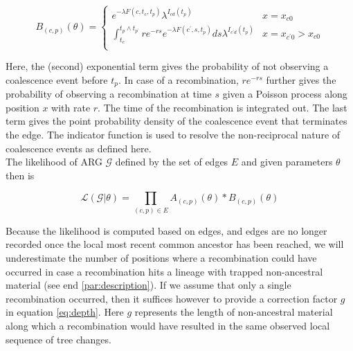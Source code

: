 \documentclass{article}
\begin{document}
\begin{equation}\label{eq:depth}
B_{(c, p)}(\theta) = \begin{cases}
e^{-\lambda F(c, t_c, t_p)} \lambda^{I_{cd}(t_p)} & x=x_{c0} \\
\int_{t_c}^{t_{p} \wedge t_{p^{\prime}}} r e^{-rs} e^{-\lambda F(c^{\prime}, s, t_{p})} ds \lambda^{I_{c^{\prime}d}(t_p)} & x=x_{c^{\prime}0}>x_{c0} \\
\end{cases}
\end{equation}

Here, the (second) exponential term gives the probability of not observing a 
coalescence event before $t_p$. In case of a recombination, $re^{-rs}$ further 
gives the probability of observing a recombination 
at time $s$ given a Poisson process along position $x$ with rate $r$. The 
time of the recombination is integrated out.
The last term gives the point probability density of the coalescence event 
that terminates the edge. The indicator function is used to resolve 
the non-reciprocal nature of coalescence events as defined here.\\

The likelihood of ARG $\mathcal{G}$ defined by the set of edges $E$ and
given parameters $\theta$ then is

\begin{equation}\label{eq:full-lik}
\mathcal{L}(\mathcal{G}|\theta) = \prod_{(c, p) \in E} A_{(c, p)}(\theta) * B_{(c, p)}(\theta)
\end{equation}


Because the likelihood is computed based on edges,
and edges are no longer recorded once the local most recent common ancestor 
has been reached, we will underestimate the number of positions where 
a recombination could have occurred in case a recombination hits a 
lineage with trapped non-ancestral material (see end \ref{par:description}). 
If we assume that only a single recombination 
occurred, then it suffices however to provide a correction factor $g$ in equation
\ref{eq:depth}. Here $g$ represents the 
length of non-ancestral material along which a recombination would have resulted  
in the same observed local sequence of tree changes.
\end{document}
